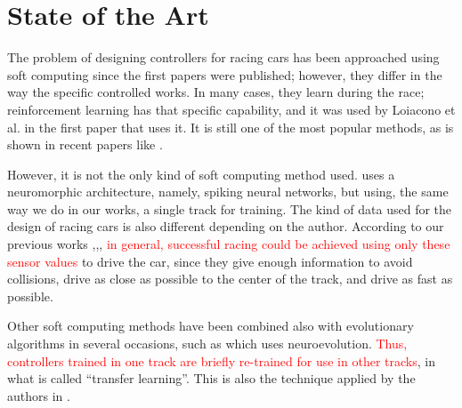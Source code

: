 \documentclass[10pt,journal,compsoc]{IEEEtran}
\begin{document}
\section{State of the Art}
\label{sec:soa}



The problem of designing controllers for racing cars has been
approached using soft computing since the first papers were
published; however, they differ in the way the specific controlled
works. In many cases, they learn during the race; reinforcement
learning has that specific capability, and it was used by Loiacono et
al. \cite{loiacono2010learning} in the first paper that uses it. It is still one of the most popular methods, as is shown in recent papers like \cite{remondaformula,waghdistributed}.

However, it is not the only kind of soft computing method
used. \cite{mirus2019short} uses a neuromorphic architecture, namely,
spiking neural networks, but using, the same way we do in our works, a single track for training. The kind of data used for the design of racing cars is
also different depending on the author. 
According to our previous works \cite{salem_evo17},\cite{salem_evo18},\cite{salem_cig2018},\textcolor{red}{ in general, successful racing could be achieved using only these sensor values }to drive the car, since they give enough information to avoid collisions, drive as close as possible to the center of the track, and drive as fast as possible.

Other soft computing methods have been combined also with evolutionary algorithms in several occasions, such as \cite{10.1371/journal.pone.0213193} which uses neuroevolution. \textcolor{red}{Thus, controllers trained in one track are briefly re-trained for use in other tracks}, in what is called ``transfer learning''. This is also the technique applied by the authors in \cite{verma2018programmatically}. 


\end{document}
